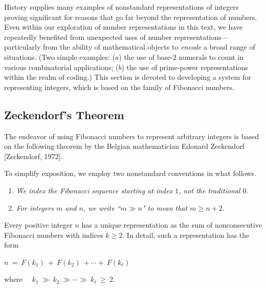 \medskip

History supplies many examples of nonstandard representations of integers proving significant for reasons that go far beyond the representation of numbers.  Even within our exploration of number representations in this text, we have repeatedly benefited from unexpected uses of number representations---particularly from the ability of mathematical objects to {\em encode} a broad range of situations.  (Two simple examples: ($a$) the use of base-$2$ numerals to count in various combinatorial applications; ($b$) the use of prime-power representations within the realm of coding.)  This section is devoted to developing a system for representing integers, which is based on the family of Fibonacci numbers.

\subsection{Zeckendorf's Theorem}
\label{sec:Zeckendorf's-Theorem}


The endeavor of using Fibonacci numbers to represent arbitrary integers is based on the following theorem by the Belgian mathematician Edouard Zeckendorf  [Zeckendorf, 1972].

\medskip

To simplify exposition, we employ two nonstandard conventions in what follows.
\begin{enumerate}
\item
{\em We index the Fibonacci sequence starting at index $1$, not the traditional $0$.}
\item
{\em For integers $m$ and $n$, we write ``$m \gg n$" to mean that $m \geq n+2$.}
\end{enumerate}

\begin{prop}
\label{thm:Zeckendorf}
Every positive integer $n$ has a unique representation as the sum of nonconsecutive Fibonacci numbers with indices $k \geq 2$.  In detail, such a representation has the form

\smallskip

\hspace*{.25in} $n \ = \ F(k_1) \ + \ F(k_2) \ + \cdots + \ F(k_\ell)$

\smallskip

\noindent
where \ \ $k_1 \ \gg \ k_2 \ \gg \cdots \gg \ k_\ell \ \geq \ 2$.
\end{prop}

